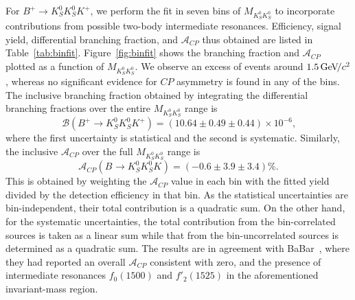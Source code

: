 \documentclass[aps,prl,preprint,tightenlines,superscriptaddress,,amsmath,byrevtex]{revtex4}
\def\KS     {\ensuremath{K^0_{\scriptscriptstyle S}}\xspace}
\newcommand{\mkk}{\ensuremath{M_{K_{S}^{0}K_{S}^{0}}}\xspace}
\def\to{\ensuremath{\rightarrow}\xspace}
\def\CP {\ensuremath{C\!P}\xspace}
\def\ACP{{\ensuremath{\mathcal{A}_{\CP}}\xspace}}
\newcommand{\gevcc}{\ensuremath{{\mathrm{\,Ge\kern -0.1em V\!/}c^2}}\xspace}
\begin{document}
For $B^{+}\to\KS\KS K^{+}$, we perform the fit in seven bins of $\mkk$  to incorporate contributions from possible two-body intermediate resonances. Efficiency, signal yield, differential branching fraction, and $\ACP$ thus obtained  are listed in Table~\ref{tab:binfit}. Figure~\ref{fig:binfit} shows the branching fraction and $\ACP$ plotted as a function of $\mkk$. We observe an excess of events around $1.5 \gevcc$, whereas no significant evidence for $\CP$ asymmetry is found in any of the bins. The inclusive branching fraction obtained by  integrating the differential branching fractions over the entire $\mkk$ range is
\begin{equation}
\mathcal{B}(B^{+} \rightarrow K_{S}^{0} K_{S}^{0} K^{+})=(10.64 \pm 0.49 \pm 0.44)\times 10^{-6}\mbox{,}
\end{equation}
where the first uncertainty is statistical and the second  is systematic. Similarly, the inclusive $\ACP$ over the full $\mkk$ range is
\begin{equation}
\ACP(B^{} \rightarrow K_{S}^{0} K_{S}^{0} K^{}) = (-0.6 \pm 3.9 \pm 3.4)\% \mbox{.}
\end{equation}
This is obtained by weighting the $\ACP$ value in each bin with the fitted yield divided by the detection efficiency in that bin. As the statistical uncertainties are bin-independent, their total contribution is a quadratic sum. On the other hand, for the systematic uncertainties, the total contribution from the bin-correlated sources is taken as a linear sum while that from the bin-uncorrelated sources is determined as a quadratic sum. The results are in agreement with BaBar~\cite{BaBar:paper1}, where they had reported an overall $\ACP$ consistent with zero, and the presence of intermediate resonances $f_0(1500)$ and $f'_2(1525)$ in the aforementioned invariant-mass region.
 
\end{document}
